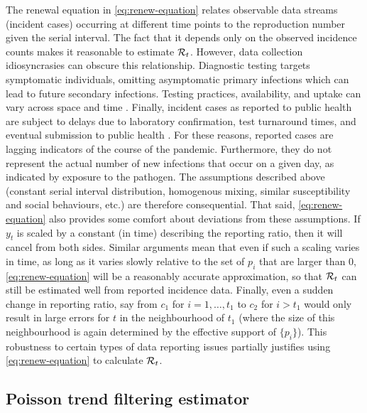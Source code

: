 The renewal equation in \eqref{eq:renew-equation} relates observable data
streams (incident cases) occurring at different time points to the reproduction
number given the serial interval. The fact that it depends only on the observed
incidence counts makes it reasonable to estimate $\mathcal{R}_t$. However, 
data collection idiosyncrasies can obscure this relationship. Diagnostic testing
targets symptomatic individuals, omitting asymptomatic primary infections which
can lead to future secondary infections. Testing practices, availability, and
uptake can vary across space and time \citep{pitzer2021impact,
hitchings2021usefulness}. Finally, incident cases as reported to public health
are subject to delays due to laboratory confirmation, test turnaround times, and
eventual submission to public health \citep{pellis2021challenges}. For these
reasons, reported cases are lagging indicators of the course of the pandemic.
Furthermore, they do not represent the actual number of new infections that
occur on a given day, as indicated by exposure to the pathogen. The assumptions
described above (constant serial interval distribution, homogenous mixing,
similar susceptibility and social behaviours, etc.) are therefore consequential.
That said, \eqref{eq:renew-equation} also provides some comfort about deviations
from these assumptions. If $y_t$ is scaled by a constant (in time) describing
the reporting ratio, then it will cancel from both sides. Similar arguments mean
that even if such a scaling varies in time, as long as it varies slowly relative
to the set of $p_i$ that are larger than 0, \eqref{eq:renew-equation} will be a
reasonably accurate approximation, so that $\mathcal{R}_t$ can still be estimated well
from reported incidence data. Finally, even a sudden change in reporting ratio, say from $c_1$ for
$i=1,\ldots,t_1$ to $c_2$ for $i>t_1$ would only result in large errors for $t$
in the neighbourhood of $t_1$ (where the size of this neighbourhood is again
determined by the effective support of $\{p_i\}$). This robustness to certain
types of data reporting issues partially justifies using
\eqref{eq:renew-equation} to calculate $\mathcal{R}_t$.

\subsection{Poisson trend filtering estimator} %

